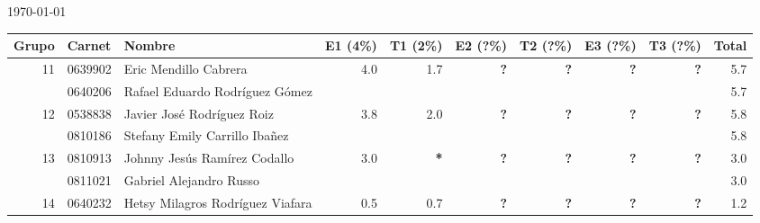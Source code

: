 \documentclass[]{article}
\begin{document}
        \newcommand{\NoE}{\textbf{*}}
        \newcommand{\NoN}{\textbf{—}}
        \newcommand{\NoX }{\textbf{?}}

        \begin{center}
          \today
        \end{center}

        \begin{table}[h!]
        \begin{center}
        \begin{tabular}{ | r | l | l | r | r | r | r | r | r | r | }
                \hline
                Grupo & Carnet & Nombre & E1 (4\%) & T1 (2\%) & E2 (?\%) & T2 (?\%) & E3 (?\%) & T3 (?\%) & Total \\

                \hline
                \multirow{2}{*}{11}
                & 0639902 & Eric Mendillo Cabrera            & \multirow{2}{*}{4.0 } & \multirow{2}{*}{1.7 } & \multirow{2}{*}{\NoX} & \multirow{2}{*}{\NoX} & \multirow{2}{*}{\NoX} & \multirow{2}{*}{\NoX} & 5.7  \\
                & 0640206 & Rafael Eduardo Rodríguez Gómez   &                       &                       &                       &                       &                       &                       & 5.7  \\
                \hline
                \multirow{2}{*}{12}
                & 0538838 & Javier José Rodríguez Roiz       & \multirow{2}{*}{3.8 } & \multirow{2}{*}{2.0 } & \multirow{2}{*}{\NoX} & \multirow{2}{*}{\NoX} & \multirow{2}{*}{\NoX} & \multirow{2}{*}{\NoX} & 5.8  \\
                & 0810186 & Stefany Emily Carrillo Ibañez    &                       &                       &                       &                       &                       &                       & 5.8  \\
                \hline
                \multirow{2}{*}{13}
                & 0810913 & Johnny Jesús Ramírez Codallo     & \multirow{2}{*}{3.0 } & \multirow{2}{*}{\NoE} & \multirow{2}{*}{\NoX} & \multirow{2}{*}{\NoX} & \multirow{2}{*}{\NoX} & \multirow{2}{*}{\NoX} & 3.0  \\
                & 0811021 & Gabriel Alejandro Russo          &                       &                       &                       &                       &                       &                       & 3.0  \\
                \hline
                \multirow{2}{*}{14}
                & 0640232 & Hetsy Milagros Rodríguez Viafara & \multirow{2}{*}{0.5 } & \multirow{2}{*}{0.7 } & \multirow{2}{*}{\NoX} & \multirow{2}{*}{\NoX} & \multirow{2}{*}{\NoX} & \multirow{2}{*}{\NoX} & 1.2  \\

\end{tabular}
\end{center}
\end{table}
\end{document}
